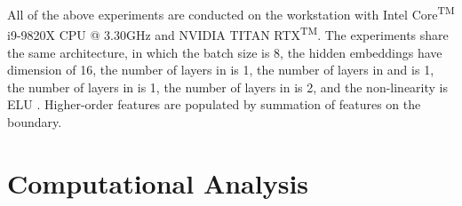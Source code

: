 \documentclass[letterpaper]{article} \usepackage{aaai24}  \usepackage{times}  \usepackage{helvet}  \usepackage{courier}  \usepackage[hyphens]{url}  \usepackage{graphicx} \urlstyle{rm} \def\UrlFont{\rm}  \usepackage{natbib}  \usepackage{caption} \frenchspacing  \setlength{\pdfpagewidth}{8.5in} \setlength{\pdfpageheight}{11in} \usepackage{algorithm}
\begin{document}
All of the above experiments are conducted on the workstation with Intel\textsuperscript{\textregistered} Core\textsuperscript{TM} i9-9820X CPU @ 3.30GHz and NVIDIA\textsuperscript{\textregistered} TITAN RTX\textsuperscript{TM}. The experiments share the same architecture, in which the batch size is 8, the hidden embeddings have dimension of 16, the number of layers in  is 1, the number of layers in  and  is 1, the number of layers in  is 1, the number of layers in  is 2, and the non-linearity is ELU \cite{clevert_fast_2016}. Higher-order features are populated by summation of features on the boundary.

\section{Computational Analysis}
\end{document}

